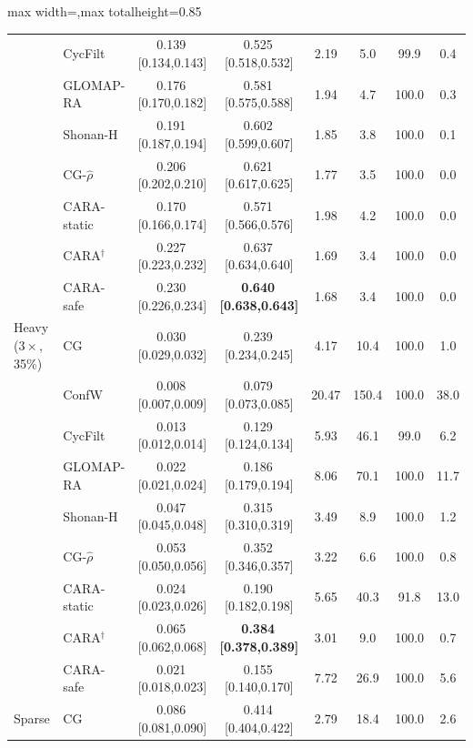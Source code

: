 \begin{table}[!htbp]
\begin{adjustbox}{max width=\textwidth,max totalheight=0.85\textheight}
\begin{tabular}{llcccccc}
 & CycFilt & 0.139\,{\scriptsize[0.134,0.143]} & 0.525\,{\scriptsize[0.518,0.532]} & 2.19 & 5.0 & 99.9 & 0.4\\
 & GLOMAP-RA & 0.176\,{\scriptsize[0.170,0.182]} & 0.581\,{\scriptsize[0.575,0.588]} & 1.94 & 4.7 & 100.0 & 0.3\\
 & Shonan-H & 0.191\,{\scriptsize[0.187,0.194]} & 0.602\,{\scriptsize[0.599,0.607]} & 1.85 & 3.8 & 100.0 & 0.1\\
 & CG-$\hat\rho$ & 0.206\,{\scriptsize[0.202,0.210]} & 0.621\,{\scriptsize[0.617,0.625]} & 1.77 & 3.5 & 100.0 & 0.0\\
 & CARA-static & 0.170\,{\scriptsize[0.166,0.174]} & 0.571\,{\scriptsize[0.566,0.576]} & 1.98 & 4.2 & 100.0 & 0.0\\
 & CARA$^{\dagger}$ & 0.227\,{\scriptsize[0.223,0.232]} & 0.637\,{\scriptsize[0.634,0.640]} & 1.69 & 3.4 & 100.0 & 0.0\\
 & CARA-safe & 0.230\,{\scriptsize[0.226,0.234]} & \textbf{0.640\,{\scriptsize[0.638,0.643]}} & 1.68 & 3.4 & 100.0 & 0.0\\
\midrule
Heavy ($3\times$, 35\%) & CG & 0.030\,{\scriptsize[0.029,0.032]} & 0.239\,{\scriptsize[0.234,0.245]} & 4.17 & 10.4 & 100.0 & 1.0\\
 & ConfW & 0.008\,{\scriptsize[0.007,0.009]} & 0.079\,{\scriptsize[0.073,0.085]} & 20.47 & 150.4 & 100.0 & 38.0\\
 & CycFilt & 0.013\,{\scriptsize[0.012,0.014]} & 0.129\,{\scriptsize[0.124,0.134]} & 5.93 & 46.1 & 99.0 & 6.2\\
 & GLOMAP-RA & 0.022\,{\scriptsize[0.021,0.024]} & 0.186\,{\scriptsize[0.179,0.194]} & 8.06 & 70.1 & 100.0 & 11.7\\
 & Shonan-H & 0.047\,{\scriptsize[0.045,0.048]} & 0.315\,{\scriptsize[0.310,0.319]} & 3.49 & 8.9 & 100.0 & 1.2\\
 & CG-$\hat\rho$ & 0.053\,{\scriptsize[0.050,0.056]} & 0.352\,{\scriptsize[0.346,0.357]} & 3.22 & 6.6 & 100.0 & 0.8\\
 & CARA-static & 0.024\,{\scriptsize[0.023,0.026]} & 0.190\,{\scriptsize[0.182,0.198]} & 5.65 & 40.3 & 91.8 & 13.0\\
 & CARA$^{\dagger}$ & 0.065\,{\scriptsize[0.062,0.068]} & \textbf{0.384\,{\scriptsize[0.378,0.389]}} & 3.01 & 9.0 & 100.0 & 0.7\\
 & CARA-safe & 0.021\,{\scriptsize[0.018,0.023]} & 0.155\,{\scriptsize[0.140,0.170]} & 7.72 & 26.9 & 100.0 & 5.6\\
\midrule
Sparse & CG & 0.086\,{\scriptsize[0.081,0.090]} & 0.414\,{\scriptsize[0.404,0.422]} & 2.79 & 18.4 & 100.0 & 2.6\\

\end{tabular}
\end{adjustbox}
\end{table}
